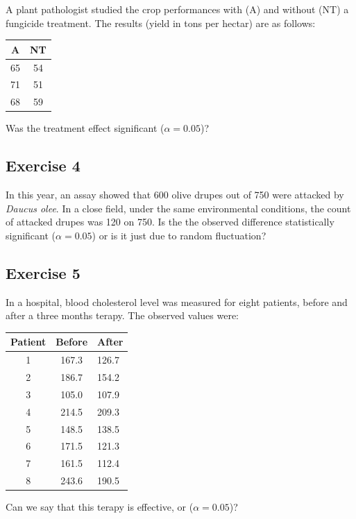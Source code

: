 \documentclass[a4paper,12pt,oneside]{book}
\begin{document}
A plant pathologist studied the crop performances with (A) and without (NT) a fungicide treatment. The results (yield in tons per hectar) are as follows:

\begin{longtable}[]{@{}cc@{}}
\toprule()
A & NT \\
\midrule()
\endhead
65 & 54 \\
71 & 51 \\
68 & 59 \\
\bottomrule()
\end{longtable}

Was the treatment effect significant (\(\alpha = 0.05\))?

\hypertarget{exercise-4-2}{%
\subsection{Exercise 4}\label{exercise-4-2}}

In this year, an assay showed that 600 olive drupes out of 750 were attacked by \emph{Daucus olee}. In a close field, under the same environmental conditions, the count of attacked drupes was 120 on 750. Is the the observed difference statistically significant (\(\alpha = 0.05\)) or is it just due to random fluctuation?

\hypertarget{exercise-5-1}{%
\subsection{Exercise 5}\label{exercise-5-1}}

In a hospital, blood cholesterol level was measured for eight patients, before and after a three months terapy. The observed values were:

\begin{longtable}[]{@{}ccl@{}}
\toprule()
Patient & Before & After \\
\midrule()
\endhead
1 & 167.3 & 126.7 \\
2 & 186.7 & 154.2 \\
3 & 105.0 & 107.9 \\
4 & 214.5 & 209.3 \\
5 & 148.5 & 138.5 \\
6 & 171.5 & 121.3 \\
7 & 161.5 & 112.4 \\
8 & 243.6 & 190.5 \\
\bottomrule()
\end{longtable}

Can we say that this terapy is effective, or (\(\alpha = 0.05\))?
\end{document}
